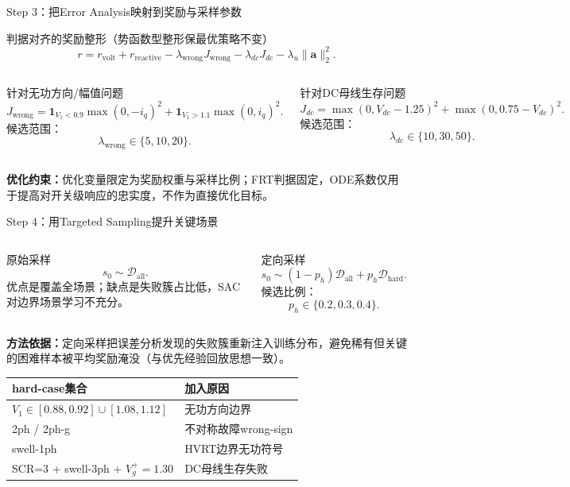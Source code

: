 \documentclass[10pt,aspectratio=169,mathserif]{beamer}
\begin{document}
\begin{frame}{Step 3：把Error Analysis映射到奖励与采样参数}
\begin{block}{判据对齐的奖励整形（势函数型整形保最优策略不变\cite{ng_shaping}）}
\[
r
=r_{\mathrm{volt}}
+r_{\mathrm{reactive}}
-\lambda_{\mathrm{wrong}}J_{\mathrm{wrong}}
-\lambda_{dc}J_{dc}
-\lambda_u\|\bm a\|_2^2 .
\]
\end{block}

\begin{columns}[T,onlytextwidth]
\begin{block}{针对无功方向/幅值问题}
\[
J_{\mathrm{wrong}}
=
\mathbf{1}_{V_1<0.9}\max(0,-i_q)^2
+
\mathbf{1}_{V_1>1.1}\max(0,i_q)^2 .
\]
候选范围：
\[
\lambda_{\mathrm{wrong}}\in\{5,10,20\}.
\]
\end{block}

\begin{block}{针对DC母线生存问题}
\[
J_{dc}
=
\max(0,V_{dc}-1.25)^2
+
\max(0,0.75-V_{dc})^2 .
\]
候选范围：
\[
\lambda_{dc}\in\{10,30,50\}.
\]
\end{block}
\end{columns}

\medskip
\textbf{优化约束：}优化变量限定为奖励权重与采样比例；FRT判据固定，ODE系数仅用于提高对开关级响应的忠实度，不作为直接优化目标。
\end{frame}

\begin{frame}{Step 4：用Targeted Sampling提升关键场景}
\begin{columns}[T,onlytextwidth]
\begin{block}{原始采样}
\[
s_0\sim\mathcal D_{\mathrm{all}}.
\]
优点是覆盖全场景；缺点是失败簇占比低，SAC对边界场景学习不充分。
\end{block}

\begin{block}{定向采样}
\[
s_0\sim
(1-p_h)\mathcal D_{\mathrm{all}}
+p_h\mathcal D_{\mathrm{hard}}.
\]
候选比例：
\[
p_h\in\{0.2,0.3,0.4\}.
\]
\end{block}
\end{columns}

\medskip
\textbf{方法依据：}定向采样把误差分析发现的失败簇重新注入训练分布，避免稀有但关键的困难样本被平均奖励淹没（与优先经验回放思想一致\cite{schaul_per,andrychowicz_rl}）。

\begin{table}
\centering\small
\begin{tabular}{ll}
\toprule
hard-case集合 & 加入原因 \\
\midrule
$V_1\in[0.88,0.92]\cup[1.08,1.12]$ & 无功方向边界 \\
2ph / 2ph-g & 不对称故障wrong-sign \\
swell-1ph & HVRT边界无功符号 \\
SCR=3 + swell-3ph + $V_g^+=1.30$ & DC母线生存失败 \\
\bottomrule
\end{tabular}
\end{table}
\end{frame}
\end{document}
